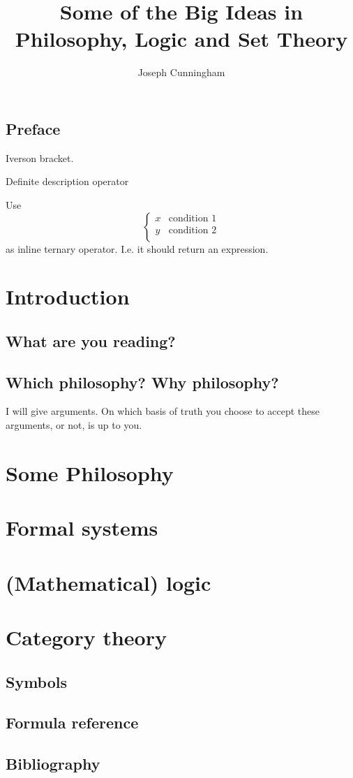 \documentclass{report}
\title{Some of the Big Ideas in \\ Philosophy, Logic and Set Theory}
\author{Joseph Cunningham}
\date{}
\begin{document}
\maketitle
\tableofcontents


\chapter{Preface}

Iverson bracket.

Definite description operator

Use
\[ \begin{cases}
x & \text{condition 1} \\
y & \text{condition 2} \\
\end{cases} \]
as inline ternary operator. I.e. it should return an expression.

\part{Introduction}
\setcounter{chapter}{0} %
\chapter{What are you reading?}
\chapter{Which philosophy? Why philosophy?}
I will give arguments. On which basis of truth you choose to accept these arguments, or not, is up to you.

\part{Some Philosophy}
\setcounter{chapter}{0} %


\part{Formal systems}
\setcounter{chapter}{0} %

 
\part{(Mathematical) logic}
\setcounter{chapter}{0} %


\part{Category theory}
\setcounter{chapter}{0} %



\appendix

\chapter{Symbols}

\chapter{Formula reference}

\chapter{Bibliography}
\end{document}
